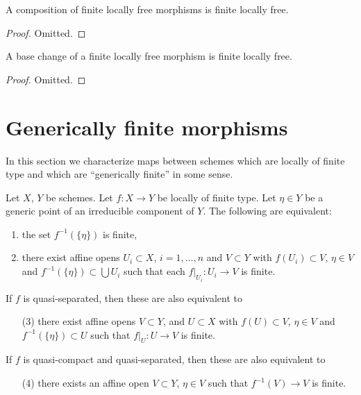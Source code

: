 \begin{lemma}
\label{lemma-composition-finite-locally-free}
A composition of finite locally free morphisms is finite locally free.
\end{lemma}

\begin{proof}
Omitted.
\end{proof}

\begin{lemma}
\label{lemma-base-change-finite-locally-free}
A base change of a finite locally free morphism is finite locally free.
\end{lemma}

\begin{proof}
Omitted.
\end{proof}


\section{Generically finite morphisms}
\label{section-generically-finite}

\noindent
In this section we characterize maps between schemes
which are locally of finite type and which are ``generically finite''
in some sense.

\begin{lemma}
\label{lemma-generically-finite}
Let $X$, $Y$ be schemes.
Let $f : X \to Y$ be locally of finite type.
Let $\eta \in Y$ be a generic point of an irreducible component
of $Y$. The following are equivalent:
\begin{enumerate}
\item the set $f^{-1}(\{\eta\})$ is finite,
\item there exist affine opens $U_i \subset X$, $i = 1, \ldots, n$
and $V \subset Y$ with $f(U_i) \subset V$,
$\eta \in V$ and $f^{-1}(\{\eta\}) \subset \bigcup U_i$
such that each $f|_{U_i} : U_i \to V$ is finite.
\end{enumerate}
If $f$ is quasi-separated, then these are also equivalent to
\begin{enumerate}
\item[(3)] there exist affine opens $V \subset Y$,
and $U \subset X$ with $f(U) \subset V$,
$\eta \in V$ and $f^{-1}(\{\eta\}) \subset U$
such that $f|_U : U \to V$ is finite.
\end{enumerate}
If $f$ is quasi-compact and quasi-separated,
then these are also equivalent to
\begin{enumerate}
\item[(4)] there exists an affine open $V \subset Y$, $\eta \in V$
such that $f^{-1}(V) \to V$ is finite.
\end{enumerate}
\end{lemma}

